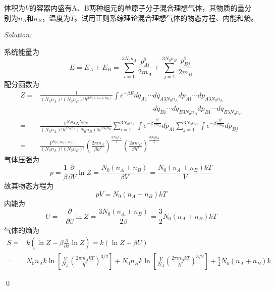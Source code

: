 \documentclass[12pt,a4paper]{article}
\newenvironment{problem}[2][Problem]{\begin{trivlist}
\item[\hskip \labelsep {\bfseries #1}\hskip \labelsep {\bfseries #2.}]}{\end{trivlist}}
\newenvironment{sol}
    {\emph{Solution:}
    }
    {
    \qed
    }
\begin{document}
\begin{problem}{9.5}
体积为$V$的容器内盛有A、B两种组元的单原子分子混合理想气体，其物质的量分别为$n_A$和$n_B$，温度为$T$。试用正则系综理论混合理想气体的物态方程、内能和熵。
\end{problem}
\begin{sol}
系统能量为
\begin{equation}
E=E_A+E_B=\sum_{i=1}^{3N_0n_A}\frac{p_{Ai}^2}{2m_A}+\sum_{j=1}^{3N_0n_B}\frac{p_{Bj}^2}{2m_B}
\end{equation}
配分函数为
\begin{align}
\nonumber Z=&\frac{1}{(N_0n_A)!(N_0n_B)!h^{3N_0(n_A+n_B)}}\int e^{-\beta E}dq_{A1}\cdots dq_{A3N_0n_A}dp_{A1}\cdots dp_{A3N_0n_A}\\
\nonumber&\quad\quad\quad\quad\quad\quad\quad\quad\quad\quad\quad\quad\quad\quad\quad\quad dq_{B1}\cdots dq_{B3N_0n_B}dp_{B1}\cdots dq_{B3N_0n_B}\\
\nonumber=&\frac{V^{N_0n_A}N^{N_0n_B}}{(N_0n_A)!h^{3N_0n_A}(N_0n_B)!h^{3N_0n_B}}\sum_{i=1}^{3N_0n_A}\int e^{-\beta\frac{p_i^2}{2m_A}}dp_{Ai}\sum_{j=1}^{3N_0n_B}\int e^{-\beta\frac{p_i^2}{2m_B}}dp_{Bj}\\
=&\frac{V^{N_0(n_A+n_B)}}{(N_0n_A)!(N_0n_B)!}\left(\frac{2\pi m_A}{\beta h^2}\right)^{\frac{3N_0n_A}{2}}\left(\frac{2\pi m_B}{\beta h^2}\right)^{\frac{3N_0n_B}{2}}
\end{align}
气体压强为
\begin{equation}
p=\frac{1}{\beta}\frac{\partial}{\partial V}\ln Z=\frac{N_0(n_A+n_B)}{\beta V}=\frac{N_0(n_A+n_B)kT}{V}
\end{equation}
故其物态方程为
\begin{equation}
pV=N_0(n_A+n_B)kT
\end{equation}
内能为
\begin{equation}
U=-\frac{\partial}{\partial\beta}\ln Z=\frac{3N_0(n_A+n_B)}{2\beta}=\frac{3}{2}N_0(n_A+n_B)kT
\end{equation}
气体的熵为
\begin{align}
\nonumber S=&k(\ln Z-\beta\frac{\partial}{\partial\beta}\ln Z)=k(\ln Z+\beta U)\\
=&N_0n_Ak\ln\left[\frac{V}{N_A}\left(\frac{2\pi m_AkT}{h^2}\right)^{3/2}\right]+N_0n_Bk\ln\left[\frac{V}{N_A}\left(\frac{2\pi m_BkT}{h^2}\right)^{3/2}\right]+\frac{5}{2}N_0(n_A+n_B)k
\end{align}
\end{sol}
\end{document}
